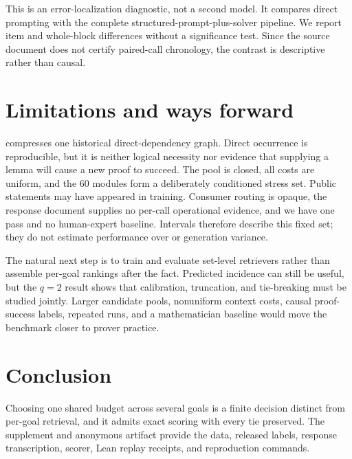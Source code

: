 \InterventionResultParagraph

This is an error-localization diagnostic, not a second model.  It compares
direct prompting with the complete structured-prompt-plus-solver pipeline.  We
report item and whole-block differences without a significance test.  Since the
source document does not certify paired-call chronology, the contrast is
descriptive rather than causal.

\section{Limitations and ways forward}

\method{} compresses one historical direct-dependency graph.  Direct occurrence
is reproducible, but it is neither logical necessity nor evidence that supplying
a lemma will cause a new proof to succeed.  The pool is closed, all costs are
uniform, and the 60 modules form a deliberately conditioned stress set.  Public
statements may have appeared in training.  Consumer routing is opaque, the
response document supplies no per-call operational evidence, and we have one
pass and no human-expert baseline.  Intervals therefore describe this fixed set;
they do not estimate performance over \mathlib{} or generation variance.

The natural next step is to train and evaluate set-level retrievers rather than
assemble per-goal rankings after the fact.  Predicted incidence can still be
useful, but the $q=2$ result shows that calibration, truncation, and tie-breaking
must be studied jointly.  Larger candidate pools, nonuniform context costs,
causal proof-success labels, repeated runs, and a mathematician baseline would
move the benchmark closer to prover practice.

\section{Conclusion}

Choosing one shared budget across several goals is a finite decision distinct
from per-goal retrieval, and it admits exact scoring with every tie preserved.
\ConclusionResultSentence{} The supplement and anonymous artifact provide the
data, released labels, response transcription, scorer, Lean replay receipts,
and reproduction commands.

\clearpage



\ifdefined\IncludeTechnicalSupplement
  \clearpage
  \appendix
  
\fi
